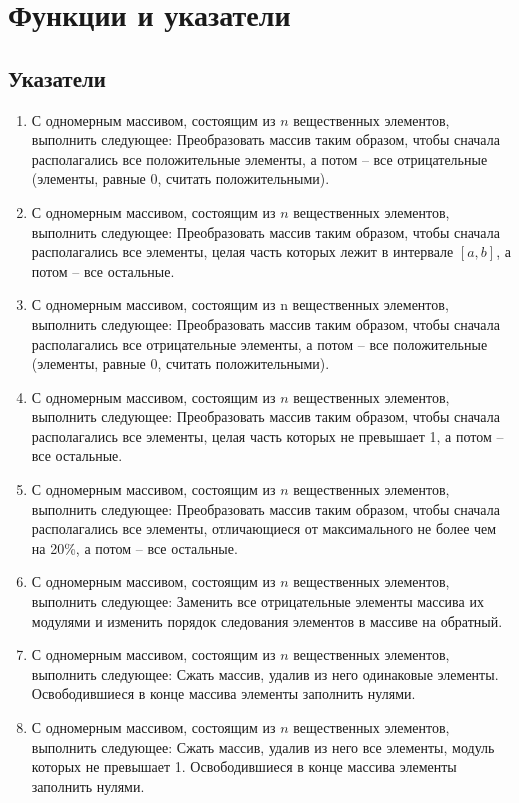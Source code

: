 \chapter{Функции и указатели}
\section{Указатели}
\begin{enumerate}[leftmargin=*]
    \item С одномерным массивом, состоящим из $n$ вещественных элементов, выполнить следующее: Преобразовать массив таким образом, чтобы сначала располагались все положительные элементы, а потом – все отрицательные (элементы, равные 0, считать положительными).
    \item С одномерным массивом, состоящим из $n$ вещественных элементов, выполнить следующее: Преобразовать массив таким образом, чтобы сначала располагались все элементы, целая часть которых лежит в интервале $[a,b]$, а потом – все остальные.
    \item С одномерным массивом, состоящим из n вещественных элементов, выполнить следующее: Преобразовать массив таким образом, чтобы сначала располагались все отрицательные элементы, а потом – все положительные (элементы, равные 0, считать положительными).
    \item С одномерным массивом, состоящим из $n$ вещественных элементов, выполнить следующее: Преобразовать массив таким образом, чтобы сначала располагались все элементы, целая часть которых не превышает 1, а потом – все остальные.
    \item С одномерным массивом, состоящим из $n$ вещественных элементов, выполнить следующее: Преобразовать массив таким образом, чтобы сначала располагались все элементы, отличающиеся от максимального не более чем на 20\%, а потом – все остальные.
    \item С одномерным массивом, состоящим из $n$ вещественных элементов, выполнить следующее: Заменить все отрицательные элементы массива их модулями и изменить порядок следования элементов в массиве на обратный.
    \item С одномерным массивом, состоящим из $n$ вещественных элементов, выполнить следующее: Сжать массив, удалив из него одинаковые элементы.  Освободившиеся в конце массива элементы заполнить нулями.
    \item С одномерным массивом, состоящим из $n$ вещественных элементов, выполнить следующее: Сжать массив, удалив из него все элементы, модуль которых не превышает 1.  Освободившиеся в конце массива элементы заполнить нулями.

\end{enumerate}
